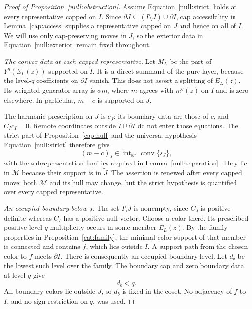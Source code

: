 \begin{proof}[Proof of Proposition~\ref{null:obstruction}]
Assume Equation~\eqref{null:strict} holds at every representative
capped on $I$.  Since
$\partial J\subseteq(I\setminus J)\cup\partial I$, cap accessibility
in Lemma~\ref{cap:access} supplies a representative capped on $J$
and hence on all of $I$.  We will use only cap-preserving moves in
$J$, so the exterior data in Equation~\eqref{null:exterior} remain
fixed throughout.

\emph{The convex data at each capped representative.}
Let $M_L$ be the part of $Y^q(E_L(z))$ supported on $\widetilde I$.
It is a direct summand of the pure layer, because the level-$q$
coefficients on $\partial I$ vanish.  This does not assert a splitting
of $E_L(z)$.  Its weighted generator array is $\phi m$, where $m$
agrees with $m^q(z)$ on $I$ and is zero elsewhere.  In particular,
$m-c$ is supported on $J$.

The harmonic prescription on $J$ is $c_J$: its boundary data are
those of $c$, and $C_Ic_I=0$.  Remote coordinates outside
$I\cup\partial I$ do not enter those equations.  The strict part of
Proposition~\ref{cap:hull} and the universal hypothesis
Equation~\eqref{null:strict} therefore give
\begin{equation}
 (m-c)_J\in\operatorname{int}_{\mathbb R^J}
       \operatorname{conv}\{s_J\},
 \label{null:interior}
\end{equation}
with the subrepresentation families required in Lemma~\ref{null:separation}.
They lie in $\mathcal M$ because their support is in $\widetilde J$.
The assertion is renewed after every capped move: both $\mathcal M$
and its hull may change, but the strict hypothesis is quantified over
every capped representative.

\emph{An occupied boundary below $q$.}
The set $I\setminus J$ is nonempty, since $C_J$ is positive definite
whereas $C_I$ has a positive null vector.  Choose a color there.
Its prescribed positive level-$q$ multiplicity occurs in some member
$E_L(z)$.  By the family properties in Proposition~\ref{cat:family},
the minimal color support of that member is connected and contains
$f$, which lies outside $I$.  A support path from the chosen color
to $f$ meets $\partial I$.  There is consequently an occupied
boundary level.  Let $d_b$ be the lowest such level over the family.
The boundary cap and zero boundary data at level $q$ give
\begin{equation}
 d_b<q.
 \label{null:boundary-level}
\end{equation}
All boundary colors lie outside $J$, so $d_b$ is fixed in the coset.
No adjacency of $f$ to $I$, and no sign restriction on $q$, was used.


\end{proof}
